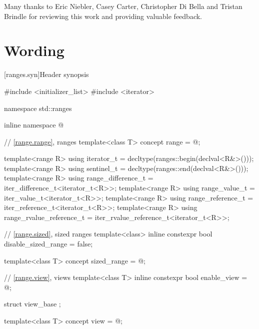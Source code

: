 \documentclass{wg21}
\begin{document}
Many thanks to Eric Niebler, Casey Carter, Christopher Di Bella and Tristan Brindle for
reviewing this work and providing valuable feedback.

\section{Wording}


[ranges.syn]{Header  synopsis}

%
\begin{codeblock}
#include <initializer_list>
#include <iterator>

namespace std::ranges {
	inline namespace @
	
	// \ref{range.range}, ranges
	template<class T>
	concept range = @\seebelow@;
	
	template<range R>
	using iterator_t = decltype(ranges::begin(declval<R&>()));
	template<range R>
	using sentinel_t = decltype(ranges::end(declval<R&>()));
	template<range R>
	using range_difference_t = iter_difference_t<iterator_t<R>>;
	template<range R>
	using range_value_t = iter_value_t<iterator_t<R>>;
	template<range R>
	using range_reference_t = iter_reference_t<iterator_t<R>>;
	template<range R>
	using range_rvalue_reference_t = iter_rvalue_reference_t<iterator_t<R>>;
	
	// \ref{range.sized}, sized ranges
	template<class>
	inline constexpr bool disable_sized_range = false;
	
	template<class T>
	concept sized_range = @\seebelow@;
	
	// \ref{range.view}, views
	template<class T>
	inline constexpr bool enable_view = @\seebelow@;
	
	struct view_base { };
	
	template<class T>
	concept view = @\seebelow@;
	
}
\end{codeblock}
\end{document}
